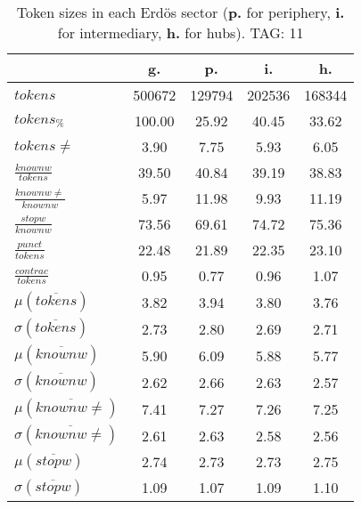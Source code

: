 \begin{table}[h!]
\begin{center}
\begin{tabular}{| l || c | c | c | c |}\hline
 & {\bf g.} & {\bf p.} & {\bf i.} & {\bf h.} \\\hline\hline
$tokens$ & 500672  & 129794  & 202536  & 168344 \\
$tokens_{\%}$ & 100.00  & 25.92  & 40.45  & 33.62 \\
$tokens \neq$ & 3.90  & 7.75  & 5.93  & 6.05 \\\hline
$\frac{knownw}{tokens}$ & 39.50  & 40.84  & 39.19  & 38.83 \\
$\frac{knownw \neq}{knownw}$ & 5.97  & 11.98  & 9.93  & 11.19 \\\hline
$\frac{stopw}{knownw}$ & 73.56  & 69.61  & 74.72  & 75.36 \\
$\frac{punct}{tokens}$ & 22.48  & 21.89  & 22.35  & 23.10 \\
$\frac{contrac}{tokens}$ & 0.95  & 0.77  & 0.96  & 1.07 \\\hline\hline
$\mu(\overline{tokens})$ & 3.82  & 3.94  & 3.80  & 3.76 \\
$\sigma(\overline{tokens})$ & 2.73  & 2.80  & 2.69  & 2.71 \\\hline
$\mu(\overline{knownw})$ & 5.90  & 6.09  & 5.88  & 5.77 \\
$\sigma(\overline{knownw})$ & 2.62  & 2.66  & 2.63  & 2.57 \\\hline
$\mu(\overline{knownw \neq})$ & 7.41  & 7.27  & 7.26  & 7.25 \\
$\sigma(\overline{knownw \neq})$ & 2.61  & 2.63  & 2.58  & 2.56 \\\hline
$\mu(\overline{stopw})$ & 2.74  & 2.73  & 2.73  & 2.75 \\
$\sigma(\overline{stopw})$ & 1.09  & 1.07  & 1.09  & 1.10 \\\hline
\end{tabular}
\caption{Token sizes in each Erd\"os sector ({{\bf p.}} for periphery, {{\bf i.}} for intermediary, {{\bf h.}} for hubs). TAG: 11}
\end{center}
\end{table}